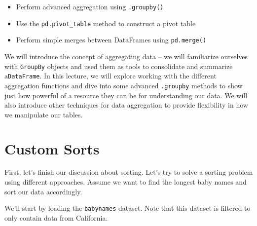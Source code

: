 \documentclass[
  letterpaper,
  DIV=11,
  numbers=noendperiod]{scrreprt}
\providecommand{\tightlist}{%
  \setlength{\itemsep}{0pt}\setlength{\parskip}{0pt}}\usepackage{longtable,booktabs,array}
\begin{document}
\begin{tcolorbox}[enhanced jigsaw, titlerule=0mm, breakable, opacityback=0, leftrule=.75mm, opacitybacktitle=0.6, colback=white, colframe=quarto-callout-note-color-frame, colbacktitle=quarto-callout-note-color!10!white, left=2mm, rightrule=.15mm, arc=.35mm, toprule=.15mm, coltitle=black, bottomrule=.15mm, bottomtitle=1mm, toptitle=1mm, title=\textcolor{quarto-callout-note-color}{\faInfo}\hspace{0.5em}{Learning Outcomes}]

\begin{itemize}
\tightlist
\item
  Perform advanced aggregation using \texttt{.groupby()}
\item
  Use the \texttt{pd.pivot\_table} method to construct a pivot table
\item
  Perform simple merges between DataFrames using \texttt{pd.merge()}
\end{itemize}

\end{tcolorbox}

We will introduce the concept of aggregating data -- we will familiarize
ourselves with \texttt{GroupBy} objects and used them as tools to
consolidate and summarize a\texttt{DataFrame}. In this lecture, we will
explore working with the different aggregation functions and dive into
some advanced \texttt{.groupby} methods to show just how powerful of a
resource they can be for understanding our data. We will also introduce
other techniques for data aggregation to provide flexibility in how we
manipulate our tables.

\hypertarget{custom-sorts}{%
\section{Custom Sorts}\label{custom-sorts}}

First, let's finish our discussion about sorting. Let's try to solve a
sorting problem using different approaches. Assume we want to find the
longest baby names and sort our data accordingly.

We'll start by loading the \texttt{babynames} dataset. Note that this
dataset is filtered to only contain data from California.
\end{document}
